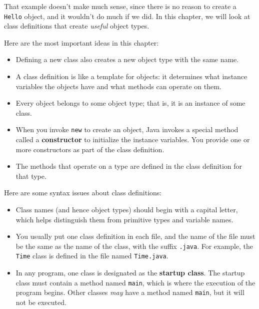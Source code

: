 \documentclass[12pt]{book}
\theoremstyle{exercise}
\begin{document}
That example doesn't make much sense, since there is no
reason to create a {\tt Hello} object, and it wouldn't do
much if we did.  In this chapter, we
will look at class definitions that create
{\em useful} object types.

Here are the most important ideas in this chapter:

\begin{itemize}

\item Defining a new class also creates a new object type
with the same name.

\item A class definition is like a template for objects:
it determines what instance variables the objects have and
what methods can operate on them.

\item Every object belongs to some object type; that is, it
is an instance of some class.

\item When you invoke {\tt new} to create an object, Java
invokes a special method called a {\bf constructor} to initialize the
instance variables.  You provide one or more constructors as part of
the class definition.

\item The methods that operate on a type are defined in the
class definition for that type.

\end{itemize}

Here are some syntax issues about class definitions:

\begin{itemize}

\item Class names (and hence object types) should begin with a capital
letter, which helps distinguish them from primitive types and variable
names.

\item You usually put one class definition in each file, and the name
of the file must be the same as the name of the class, with the suffix
{\tt .java}.  For example, the {\tt Time} class is defined in the file
named {\tt Time.java}.

\item In any program, one class is designated as the {\bf startup
class}.  The startup class must contain a method named {\tt main}, which
is where the execution of the program begins.  Other classes {\em may}
have a method named {\tt main}, but it will not be executed.

\end{itemize}
\end{document}
